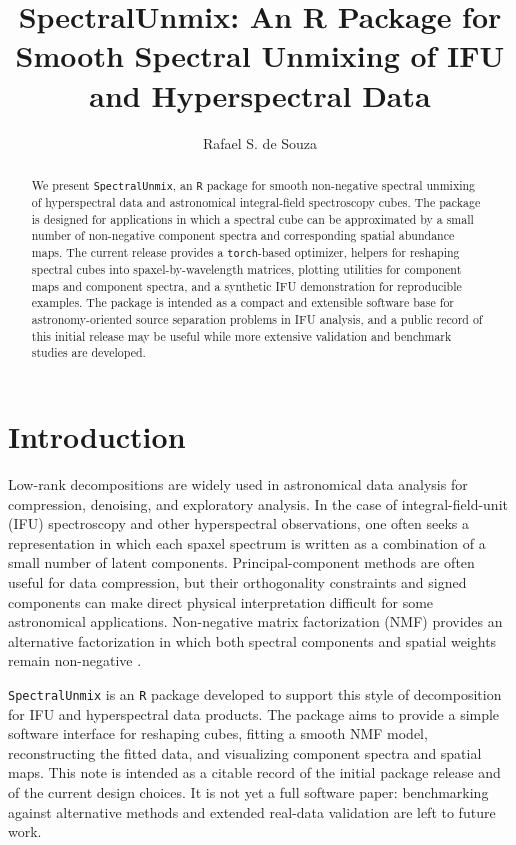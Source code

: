 \documentclass[rnaas]{aastex7}
\begin{document}
\title{SpectralUnmix: An R Package for Smooth Spectral Unmixing of IFU and Hyperspectral Data}

\author[0000-0001-7207-4584]{Rafael S. de Souza}

\begin{abstract}
We present \texttt{SpectralUnmix}, an \texttt{R} package for smooth
non-negative spectral unmixing of hyperspectral data and astronomical
integral-field spectroscopy cubes. The package is designed for applications in
which a spectral cube can be approximated by a small number of non-negative
component spectra and corresponding spatial abundance maps. The current release
provides a \texttt{torch}-based optimizer, helpers for reshaping spectral cubes
into spaxel-by-wavelength matrices, plotting utilities for component maps and
component spectra, and a synthetic IFU demonstration for reproducible examples.
The package is intended as a compact and extensible software base for
astronomy-oriented source separation problems in IFU analysis, and a public
record of this initial release may be useful while more extensive validation
and benchmark studies are developed.
\end{abstract}

\section{Introduction}

Low-rank decompositions are widely used in astronomical data analysis for
compression, denoising, and exploratory analysis. In the case of
integral-field-unit (IFU) spectroscopy and other hyperspectral observations,
one often seeks a representation in which each spaxel spectrum is written as a
combination of a small number of latent components. Principal-component methods
are often useful for data compression, but their orthogonality constraints and
signed components can make direct physical interpretation difficult for some
astronomical applications. Non-negative matrix factorization (NMF) provides an
alternative factorization in which both spectral components and spatial weights
remain non-negative \citep{Lee1999,Cichocki2009}.

\texttt{SpectralUnmix} is an \texttt{R} package developed to support this style
of decomposition for IFU and hyperspectral data products. The package aims to
provide a simple software interface for reshaping cubes, fitting a smooth NMF
model, reconstructing the fitted data, and visualizing component spectra and
spatial maps. This note is intended as a citable record of the initial package
release and of the current design choices. It is not yet a full software paper:
benchmarking against alternative methods and extended real-data validation are
left to future work.
\end{document}
